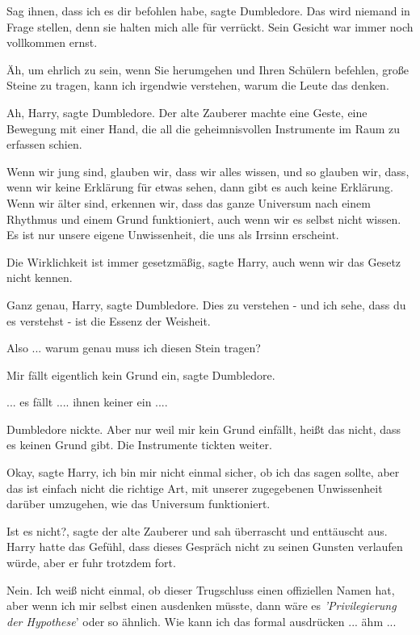 \glqq{}Sag ihnen, dass ich es dir befohlen habe\grqq{}, sagte Dumbledore. \glqq{}
Das wird niemand in Frage stellen, denn sie halten mich alle für
verrückt.\grqq{} Sein Gesicht war immer noch vollkommen ernst.

\glqq{}Äh, um ehrlich zu sein, wenn Sie herumgehen und Ihren Schülern befehlen,
große Steine zu tragen, kann ich irgendwie verstehen, warum die Leute das
denken.\grqq{}

\glqq{}Ah, Harry\grqq{}, sagte Dumbledore. Der alte Zauberer machte eine Geste,
eine Bewegung mit einer Hand, die all die geheimnisvollen Instrumente im Raum zu
erfassen schien.

\glqq{}Wenn wir jung sind, glauben wir, dass wir alles wissen, und so glauben
wir, dass, wenn wir keine Erklärung für etwas sehen, dann gibt es auch keine
Erklärung. Wenn wir älter sind, erkennen wir, dass das ganze Universum nach
einem Rhythmus und einem Grund funktioniert, auch wenn wir es selbst nicht
wissen. Es ist nur unsere eigene Unwissenheit, die uns als Irrsinn
erscheint.\grqq{}

\glqq{}Die Wirklichkeit ist immer gesetzmäßig\grqq{}, sagte Harry, \glqq{}auch
wenn wir das Gesetz nicht kennen.\grqq{}

\glqq{}Ganz genau, Harry\grqq{}, sagte Dumbledore. \glqq{}Dies zu verstehen - und
ich sehe, dass du es verstehst - ist die Essenz der Weisheit.\grqq{}

\glqq{}Also ... warum genau muss ich diesen Stein tragen?\grqq{}

\glqq{}Mir fällt eigentlich kein Grund ein\grqq{}, sagte Dumbledore.

\glqq{}... es fällt .... ihnen keiner ein ....\grqq{}

Dumbledore nickte. \glqq{}Aber nur weil mir kein Grund einfällt, heißt das nicht,
dass es keinen Grund gibt.\grqq{} Die Instrumente tickten weiter.

\glqq{}Okay\grqq{}, sagte Harry, \glqq{}ich bin mir nicht einmal sicher, ob ich
das sagen sollte, aber das ist einfach nicht die richtige Art, mit unserer
zugegebenen Unwissenheit darüber umzugehen, wie das Universum
funktioniert.\grqq{}

\glqq{}Ist es nicht?\grqq{}, sagte der alte Zauberer und sah überrascht und
enttäuscht aus. Harry hatte das Gefühl, dass dieses Gespräch nicht zu seinen
Gunsten verlaufen würde, aber er fuhr trotzdem fort.

\glqq{}Nein. Ich weiß nicht einmal, ob dieser Trugschluss einen offiziellen Namen
hat, aber wenn ich mir selbst einen ausdenken müsste, dann wäre es
\emph{'Privilegierung der Hypothese}' oder so ähnlich. Wie kann ich das formal
ausdrücken ... ähm ...

